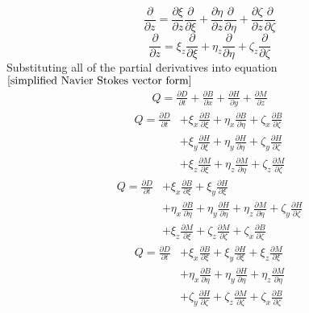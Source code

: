 \documentclass[a4paper, 12pt]{report}
\begin{document}
\begin{center}
$$\frac{\partial}{\partial z} = \frac{\partial\xi}{\partial z}\frac{\partial}{\partial\xi} + \frac{\partial\eta}{\partial z}\frac{\partial}{\partial\eta} + \frac{\partial\zeta}{\partial z}\frac{\partial}{\partial\zeta}$$
$$\frac{\partial}{\partial z} = \xi_{z}\frac{\partial}{\partial\xi} + \eta_{z}\frac{\partial}{\partial\eta} + \zeta_{z}\frac{\partial}{\partial\zeta}$$
Substituting all of the partial derivatives into equation $\ref{simplified Navier Stokes vector form}$
\begin{align*}
Q = \frac{\partial D}{\partial t} + \frac{\partial B}{\partial x} + \frac{\partial H}{\partial y} + \frac{\partial M}{\partial z}
\end{align*}
\begin{align*}
Q = \frac{\partial D}{\partial t} & + \xi_{x}\frac{\partial B}{\partial \xi} + \eta_{x}\frac{\partial B}{\partial \eta} + \zeta_{x}\frac{\partial B}{\partial \zeta}
\\ & + \xi_{y}\frac{\partial H}{\partial \xi} + \eta_{y}\frac{\partial H}{\partial \eta} + \zeta_{y}\frac{\partial H}{\partial \zeta}
\\ & + \xi_{z}\frac{\partial M}{\partial\xi} + \eta_{z}\frac{\partial M}{\partial\eta} + \zeta_{z}\frac{\partial M}{\partial\zeta}
\end{align*}
\begin{align*}
Q = \frac{\partial D}{\partial t} & + \xi_{x}\frac{\partial B}{\partial \xi} + \xi_{y}\frac{\partial H}{\partial \xi}
\\ & + \eta_{x}\frac{\partial B}{\partial \eta} + \eta_{y}\frac{\partial H}{\partial \eta} + \eta_{z}\frac{\partial M}{\partial\eta} + \zeta_{y}\frac{\partial H}{\partial \zeta}
\\ & + \xi_{z}\frac{\partial M}{\partial\xi} + \zeta_{z}\frac{\partial M}{\partial\zeta} + \zeta_{x}\frac{\partial B}{\partial \zeta}
\end{align*}
\begin{align*}
Q = \frac{\partial D}{\partial t} & + \xi_{x}\frac{\partial B}{\partial \xi} + \xi_{y}\frac{\partial H}{\partial \xi} + \xi_{z}\frac{\partial M}{\partial\xi}
\\ & + \eta_{x}\frac{\partial B}{\partial \eta} + \eta_{y}\frac{\partial H}{\partial \eta} + \eta_{z}\frac{\partial M}{\partial\eta}
\\ & + \zeta_{y}\frac{\partial H}{\partial \zeta} + \zeta_{z}\frac{\partial M}{\partial\zeta} + \zeta_{x}\frac{\partial B}{\partial \zeta}
\end{align*}
\begin{align*}

\end{align*}
\end{center}
\end{document}
